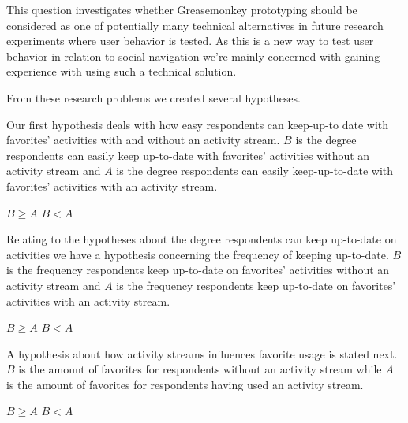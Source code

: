 This question investigates whether Greasemonkey prototyping should be
considered as one of potentially many technical alternatives in future
research experiments where user behavior is tested. As this is a new way
to test user behavior in relation to social navigation we're mainly concerned
with gaining experience with using such a technical solution.

\parabreak

From these research problems we created several hypotheses.

Our first hypothesis deals with how easy respondents can keep-up-to
date with favorites' activities with and without an 
activity stream.
$B$ is the degree respondents can easily keep up-to-date with
favorites' activities without an activity stream and $A$ is the degree
respondents can easily keep-up-to-date with favorites' activities  with
an activity stream.
\begin{items}
   $B \geq A$
   $B < A$
\end{items}

Relating to the hypotheses about the degree respondents can keep
up-to-date on activities we have a hypothesis concerning
the frequency of keeping up-to-date.
$B$ is the frequency respondents keep up-to-date on favorites' activities
without an activity stream and $A$ is the frequency respondents keep
up-to-date on favorites' activities with an activity stream.
\begin{items}
   $B \geq A$
   $B < A$
\end{items}

A hypothesis about how activity streams influences favorite usage is stated
next.
$B$ is the amount of favorites for respondents without an activity stream
while $A$ is the amount of favorites for respondents having used an activity
stream.
\begin{items}
   $B \geq A$
   $B < A$
\end{items}
